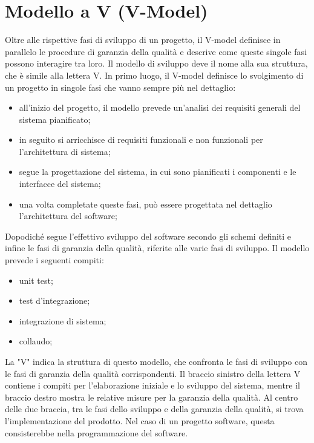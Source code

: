 \section{Modello a V (V-Model)}
Oltre alle rispettive fasi di sviluppo di un progetto, il V-model definisce in parallelo le procedure di garanzia della qualità e descrive come queste singole fasi possono interagire tra loro. Il modello di sviluppo deve il nome alla sua struttura, che è simile alla lettera V.
In primo luogo, il V-model definisce lo svolgimento di un progetto in singole fasi che vanno sempre più nel dettaglio:
\begin{itemize}
    \item all'inizio del progetto, il modello prevede un'analisi dei requisiti generali del sistema pianificato;
    \item in seguito si arricchisce di requisiti funzionali e non funzionali per l’architettura di sistema;
    \item segue la progettazione del sistema, in cui sono pianificati i componenti e le interfacce del sistema;
    \item una volta completate queste fasi, può essere progettata nel dettaglio l'architettura del software;
\end{itemize}
Dopodiché segue l’effettivo sviluppo del software secondo gli schemi definiti e infine le fasi di garanzia della qualità, riferite alle varie fasi di sviluppo. Il modello prevede i seguenti compiti:
\begin{itemize}
    \item unit test;
    \item test d'integrazione;
    \item integrazione di sistema;
    \item collaudo;
\end{itemize}
La "V" indica la struttura di questo modello, che confronta le fasi di sviluppo con le fasi di garanzia della qualità corrispondenti. Il braccio sinistro della lettera V contiene i compiti per l'elaborazione iniziale e lo sviluppo del sistema, mentre il braccio destro mostra le relative misure per la garanzia della qualità. Al centro delle due braccia, tra le fasi dello sviluppo e della garanzia della qualità, si trova l'implementazione del prodotto. Nel caso di un progetto software, questa consisterebbe nella programmazione del software.

